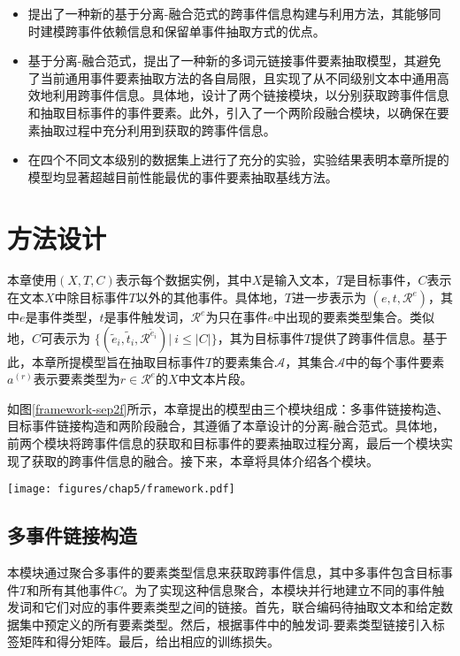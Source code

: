 \begin{itemize}
\item 提出了一种新的基于分离-融合范式的跨事件信息构建与利用方法，其能够同时建模跨事件依赖信息和保留单事件抽取方式的优点。
\item 基于分离-融合范式，提出了一种新的多词元链接事件要素抽取模型，其避免了当前通用事件要素抽取方法的各自局限，且实现了从不同级别文本中通用高效地利用跨事件信息。具体地，设计了两个链接模块，以分别获取跨事件信息和抽取目标事件的事件要素。此外，引入了一个两阶段融合模块，以确保在要素抽取过程中充分利用到获取的跨事件信息。
\item 在四个不同文本级别的数据集上进行了充分的实验，实验结果表明本章所提的模型均显著超越目前性能最优的事件要素抽取基线方法。
\end{itemize}

\section{方法设计}

本章使用$(X,T,C)$表示每个数据实例，其中$X$是输入文本，$T$是目标事件，$C$表示在文本$X$中除目标事件$T$以外的其他事件。具体地，$T$进一步表示为 $\left(e,t,\mathcal{R}^{e}\right)$，其中$e$是事件类型，$t$是事件触发词，$\mathcal{R}^{e}$为只在事件$e$中出现的要素类型集合。类似地，$C$可表示为
$\{(\tilde{e}_i,\tilde{t}_i,\mathcal{R}^{\tilde{e}_i})|~i \leq |C|\}$，其为目标事件$T$提供了跨事件信息。基于此，本章所提模型旨在抽取目标事件$T$的要素集合$\mathcal{A}$，其集合$\mathcal{A}$中的每个事件要素$a^{(r)}$表示要素类型为$r \in \mathcal{R}^{e}$的$X$中文本片段。

如图\ref{framework-sep2f}所示，本章提出的模型由三个模块组成：多事件链接构造、目标事件链接构造和两阶段融合，其遵循了本章设计的分离-融合范式。具体地，前两个模块将跨事件信息的获取和目标事件的要素抽取过程分离，最后一个模块实现了获取的跨事件信息的融合。接下来，本章将具体介绍各个模块。

\begin{figure*}[htp]
\centering
\texttt{[image: figures/chap5/framework.pdf]}
\caption{Sep2F模型架构图}
\label{framework-sep2f}
\end{figure*}

\subsection{多事件链接构造}
本模块通过聚合多事件的要素类型信息来获取跨事件信息，其中多事件包含目标事件$T$和所有其他事件$C$。为了实现这种信息聚合，本模块并行地建立不同的事件触发词和它们对应的事件要素类型之间的链接。首先，联合编码待抽取文本和给定数据集中预定义的所有要素类型。然后，根据事件中的触发词-要素类型链接引入标签矩阵和得分矩阵。最后，给出相应的训练损失。

